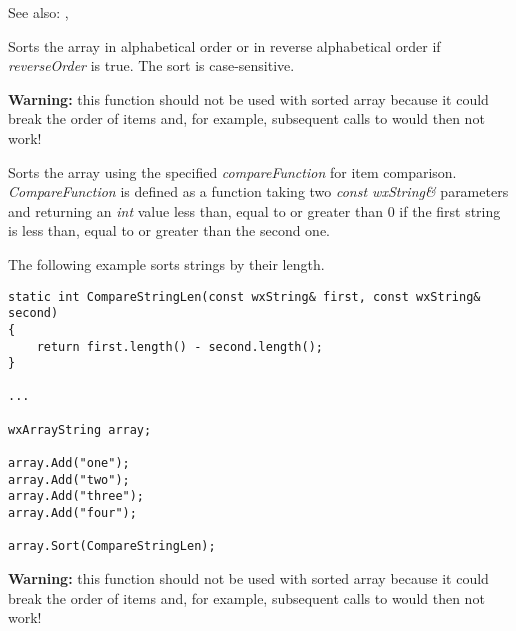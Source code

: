 See also: , 

\label{wxarraystringsort}


Sorts the array in alphabetical order or in reverse alphabetical order if 
{\it reverseOrder} is true. The sort is case-sensitive.

{\bf Warning:} this function should not be used with sorted array because it
could break the order of items and, for example, subsequent calls to 
 would then not work!


Sorts the array using the specified {\it compareFunction} for item comparison.
{\it CompareFunction} is defined as a function taking two {\it const
wxString\&} parameters and returning an {\it int} value less than, equal to or
greater than 0 if the first string is less than, equal to or greater than the
second one.


The following example sorts strings by their length.

\begin{verbatim}
static int CompareStringLen(const wxString& first, const wxString& second)
{
    return first.length() - second.length();
}

...

wxArrayString array;

array.Add("one");
array.Add("two");
array.Add("three");
array.Add("four");

array.Sort(CompareStringLen);
\end{verbatim}

{\bf Warning:} this function should not be used with sorted array because it
could break the order of items and, for example, subsequent calls to 
 would then not work!

